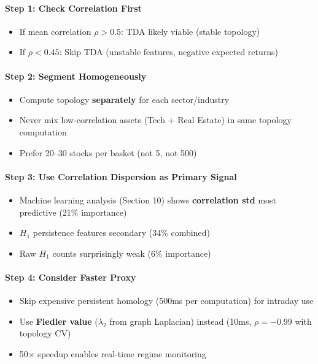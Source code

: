 \paragraph{Step 1: Check Correlation First}
\begin{itemize}
\item If mean correlation $\rho > 0.5$: TDA likely viable (stable topology)
\item If $\rho < 0.45$: Skip TDA (unstable features, negative expected returns)
\end{itemize}

\paragraph{Step 2: Segment Homogeneously}
\begin{itemize}
\item Compute topology \textbf{separately} for each sector/industry
\item Never mix low-correlation assets (Tech + Real Estate) in same topology computation
\item Prefer 20--30 stocks per basket (not 5, not 500)
\end{itemize}

\paragraph{Step 3: Use Correlation Dispersion as Primary Signal}
\begin{itemize}
\item Machine learning analysis (Section 10) shows \textbf{correlation std} most predictive (21\% importance)
\item $H_1$ persistence features secondary (34\% combined)
\item Raw $H_1$ counts surprisingly weak (6\% importance)
\end{itemize}

\paragraph{Step 4: Consider Faster Proxy}
\begin{itemize}
\item Skip expensive persistent homology (500ms per computation) for intraday use
\item Use \textbf{Fiedler value} ($\lambda_2$ from graph Laplacian) instead (10ms, $\rho = -0.99$ with topology CV)
\item 50$\times$ speedup enables real-time regime monitoring
\end{itemize}

